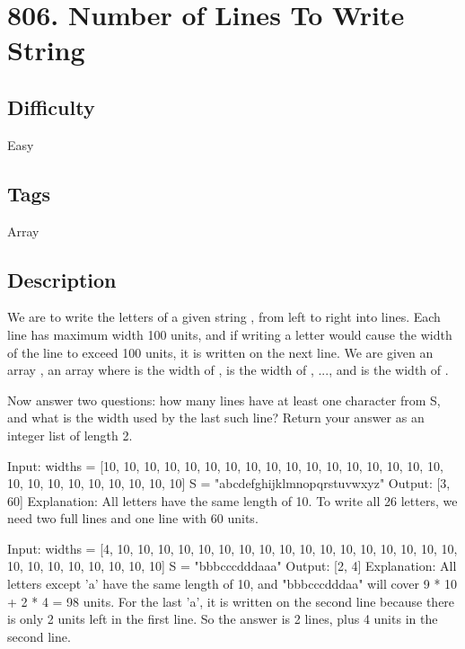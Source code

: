 \tocless\section{806. Number of Lines To Write String}
\label{algo:806}

\subsection*{Difficulty}
Easy

\subsection*{Tags}
Array

\subsection*{Description}
We are to write the letters of a given string , from left to right into lines. Each line has maximum width 100 units, and if writing a letter would cause the width of the line to exceed 100 units, it is written on the next line. We are given an array , an array where  is the width of ,  is the width of , ..., and  is the width of .

Now answer two questions: how many lines have at least one character from S, and what is the width used by the last such line? Return your answer as an integer list of length 2.

\begin{example}
\begin{multilinecode}
Input:
widths = [10, 10, 10, 10, 10, 10, 10, 10, 10, 10, 10, 10, 10, 10, 10, 10, 10, 10, 10, 10, 10, 10, 10, 10, 10, 10]
S = "abcdefghijklmnopqrstuvwxyz"
Output: [3, 60]
Explanation:
All letters have the same length of 10. To write all 26 letters,
we need two full lines and one line with 60 units.
\end{multilinecode}
\end{example}

\begin{example}
\begin{multilinecode}
Input:
widths = [4, 10, 10, 10, 10, 10, 10, 10, 10, 10, 10, 10, 10, 10, 10, 10, 10, 10, 10, 10, 10, 10, 10, 10, 10, 10]
S = "bbbcccdddaaa"
Output: [2, 4]
Explanation:
All letters except 'a' have the same length of 10, and 
"bbbcccdddaa" will cover 9 * 10 + 2 * 4 = 98 units.
For the last 'a', it is written on the second line because
there is only 2 units left in the first line.
So the answer is 2 lines, plus 4 units in the second line.
\end{multilinecode}
\end{example}


